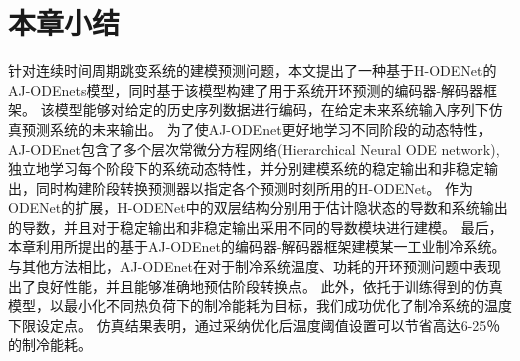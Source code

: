 \section{本章小结}
\label{sec:conclusion}
针对连续时间周期跳变系统的建模预测问题，本文提出了一种基于H-ODENet的AJ-ODEnets模型，同时基于该模型构建了用于系统开环预测的编码器-解码器框架。
该模型能够对给定的历史序列数据进行编码，在给定未来系统输入序列下仿真预测系统的未来输出。
为了使AJ-ODEnet更好地学习不同阶段的动态特性，AJ-ODEnet包含了多个层次常微分方程网络(Hierarchical Neural ODE network), 独立地学习每个阶段下的系统动态特性，并分别建模系统的稳定输出和非稳定输出，同时构建阶段转换预测器以指定各个预测时刻所用的H-ODENet。
作为ODENet的扩展，H-ODENet中的双层结构分别用于估计隐状态的导数和系统输出的导数，并且对于稳定输出和非稳定输出采用不同的导数模块进行建模。
最后，本章利用所提出的基于AJ-ODEnet的编码器-解码器框架建模某一工业制冷系统。与其他方法相比，AJ-ODEnet在对于制冷系统温度、功耗的开环预测问题中表现出了良好性能，并且能够准确地预估阶段转换点。
此外，依托于训练得到的仿真模型，以最小化不同热负荷下的制冷能耗为目标，我们成功优化了制冷系统的温度下限设定点。
仿真结果表明，通过采纳优化后温度阈值设置可以节省高达6-25％的制冷能耗。







